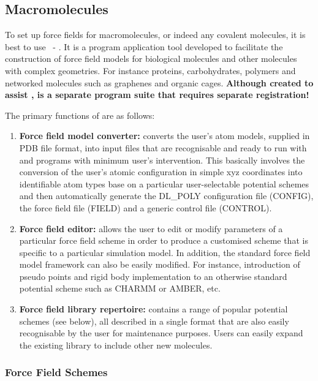 \subsection{Macromolecules}

To set up force fields for macromolecules, or indeed any covalent
molecules, it is best to use \F ~- \WEF{}.  It is a program
application tool developed to facilitate the construction of force
field models for biological molecules and other molecules with complex
geometries.  For instance proteins, carbohydrates, polymers and
networked molecules such as graphenes and organic cages.  {\bf Although
created to assist \D, \F is a separate program suite that requires
separate registration!}

The primary functions of \F are as follows:
\begin{enumerate}
\item {\bf Force field model converter:} \F converts the user's atom
models, supplied in PDB file format, into input files that are
recognisable and ready to run with \C and \D programs with minimum
user's intervention.  This basically involves the conversion of the
user's atomic configuration in simple xyz coordinates into identifiable
atom types base on a particular user-selectable potential schemes and
then automatically generate the DL\_POLY configuration file (CONFIG),
the force field file (FIELD) and a generic control file (CONTROL).
\item {\bf Force field editor:} \F allows the user to edit or modify
parameters of a particular force field scheme in order to produce a
customised scheme that is specific to a particular simulation model.
In addition, the standard force field model framework can also be easily
modified.  For instance, introduction of pseudo points and rigid body
implementation to an otherwise standard potential scheme such as CHARMM
or AMBER, etc.
\item {\bf Force field library repertoire:} \F contains a range of
popular potential schemes (see below), all described in a single \F
format that are also easily recognisable by the user for maintenance
purposes.  Users can easily expand the existing library to include
other new molecules.
\end{enumerate}

\subsubsection*{Force Field Schemes}

